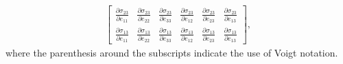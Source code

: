 \documentclass[12pt,aps,pre]{revtex4}
\begin{document}
\begin{eqnarray}
\begin{bmatrix}
%
\frac{\partial \sigma_{23}}{\partial e_{11}} & \frac{\partial \sigma_{23}}{\partial e_{22}} & \frac{\partial \sigma_{23}}{\partial e_{33}} & \frac{\partial \sigma_{23}}{\partial e_{12}} & \frac{\partial \sigma_{23}}{\partial e_{23}} & \frac{\partial \sigma_{23}}{\partial e_{13}} \\
%
\frac{\partial \sigma_{13}}{\partial e_{11}} & \frac{\partial \sigma_{13}}{\partial e_{22}} & \frac{\partial \sigma_{13}}{\partial e_{33}} & \frac{\partial \sigma_{13}}{\partial e_{12}} & \frac{\partial \sigma_{13}}{\partial e_{23}} & \frac{\partial \sigma_{13}}{\partial e_{13}} 
\end{bmatrix},
\label{eq:sigma_terms_Voigt}
\end{eqnarray}
%
where the parenthesis around the subscripts indicate the use of Voigt notation.
\end{document}
